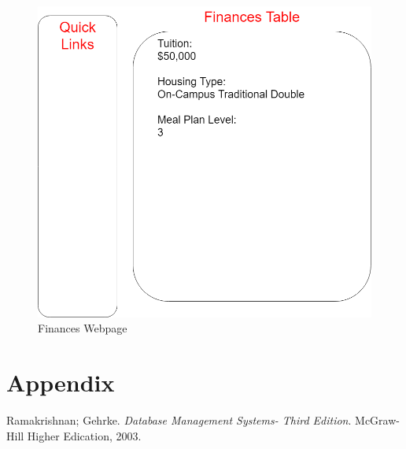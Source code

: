 \documentclass{article}
\begin{document}
      \begin{figure}[H]
        \centering
        \includegraphics[width=4 in]{Design/Finances}
        \caption{Finances Webpage}
        \label{fig:Finances}
      \end{figure}

    \newpage


  \section{Appendix}\label{sec:Appendix}

  \medskip


  \begin{thebibliography}{1}

    Ramakrishnan; Gehrke.
    \textit{Database Management Systems- Third Edition}.
    McGraw-Hill Higher Edication, 2003.

  \end{thebibliography}
\end{document}
